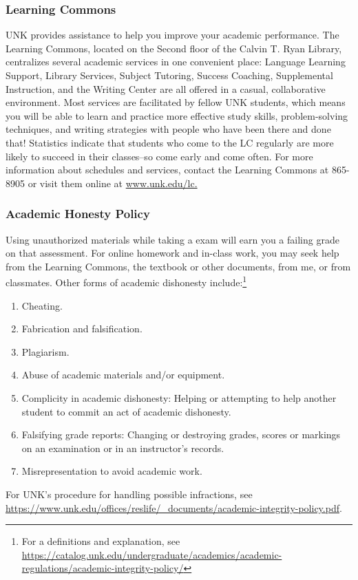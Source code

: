 \documentclass[12pt]{article}
\newcounter{ex}\setcounter{ex}{0}
\newcounter{dy}\setcounter{dy}{0}
\newcounter{cy}\setcounter{cy}{\the\year}
\begin{document}
\subsubsection*{Learning Commons}
UNK provides assistance to help you improve your academic performance. The Learning Commons, located on the Second floor of the Calvin T. Ryan Library, centralizes several academic
services in one convenient place: Language Learning Support, Library Services, Subject Tutoring, Success Coaching, Supplemental Instruction, and the Writing Center are all
offered in a casual, collaborative environment.  Most services are facilitated by fellow UNK students, which means you will be able to learn and practice more effective
study skills, problem-solving techniques, and writing strategies with people who have been there and done that!  Statistics indicate that students who come to the LC
regularly are more likely to succeed in their classes--so come early and come often. For more information about schedules and services, contact the Learning Commons at
865-8905 or visit them online at \url{www.unk.edu/lc.}

\subsubsection*{Academic Honesty Policy}

Using unauthorized materials while taking a exam will earn you a failing grade on that assessment. For online homework and in-class work, you may seek help from the Learning Commons, the textbook or other documents, from me, or from classmates.  Other forms of academic dishonesty  include:\footnote{For a definitions and explanation, see \url{https://catalog.unk.edu/undergraduate/academics/academic-regulations/academic-integrity-policy/}}

\begin{enumerate}

 \item  Cheating.

 \item Fabrication and falsification.

 \item Plagiarism.

 \item Abuse of academic materials and/or equipment.

 \item Complicity in academic dishonesty: Helping or attempting to help another student to commit an act of academic dishonesty.

   \item  Falsifying grade reports: Changing or destroying grades, scores or markings on an examination or in an instructor's records.

   \item Misrepresentation to avoid academic work.

 \end{enumerate}
For UNK's procedure for handling possible infractions, see \url{https://www.unk.edu/offices/reslife/_documents/academic-integrity-policy.pdf}.
\end{document}
